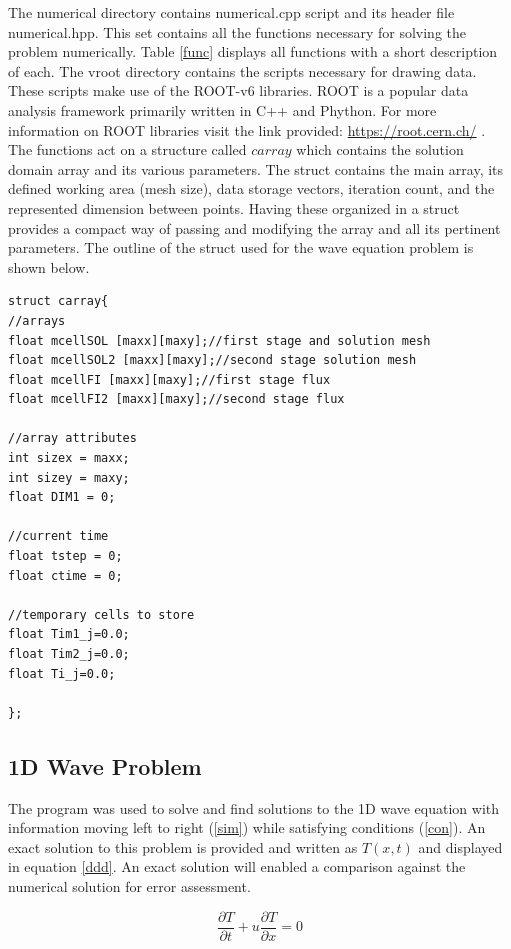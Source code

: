 \documentclass[paper=a4, fontsize=11pt, abstract=on]{scrartcl}
\numberwithin{equation}{section}		%
\numberwithin{figure}{section}			%
\numberwithin{table}{section}				%
\begin{document}
The numerical directory contains numerical.cpp script and its header file numerical.hpp. This set contains all the functions necessary for solving the problem numerically. Table \ref{func} displays all functions with a short description of each. The vroot directory contains the scripts necessary for drawing data. These scripts make use of the ROOT-v6 libraries. ROOT is a popular data analysis framework primarily written in C++ and Phython. For more information on ROOT libraries visit the link provided: \url{https://root.cern.ch/} .
The functions act on a structure called $carray$ which contains the solution domain array and its various parameters. The struct contains the main array, its defined working area (mesh size), data storage vectors, iteration count, and the represented dimension between points. Having these organized in a struct provides a compact way of passing and modifying the array and all its pertinent parameters. The outline of the struct used for the wave equation problem is shown below.


\begin{lstlisting}
struct carray{
//arrays
float mcellSOL [maxx][maxy];//first stage and solution mesh
float mcellSOL2 [maxx][maxy];//second stage solution mesh
float mcellFI [maxx][maxy];//first stage flux
float mcellFI2 [maxx][maxy];//second stage flux

//array attributes
int sizex = maxx;
int sizey = maxy;
float DIM1 = 0;

//current time 
float tstep = 0;
float ctime = 0;

//temporary cells to store
float Tim1_j=0.0;
float Tim2_j=0.0;
float Ti_j=0.0;

};
\end{lstlisting}
 
\subsection{1D Wave Problem}
The program was used to solve and find solutions to the 1D wave equation with information moving left to right (\ref{sim}) while satisfying conditions (\ref{con}). An exact solution to this problem is provided and written as $T(x,t)$ and displayed in equation \ref{ddd}. An exact solution will enabled a comparison against the numerical solution for error assessment. 

 \begin{equation}
\label{sim}
\frac{\partial T}{\partial t} + u\frac{\partial T}{\partial x} = 0
\end{equation}
\end{document}
